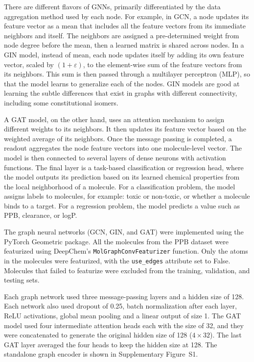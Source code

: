 \documentclass[11pt,a4paper]{article}
\begin{document}
There are different flavors of GNNs, primarily differentiated by the data aggregation method used by each node.
For example, in GCN, a node updates its feature vector as a mean that includes all the feature vectors from its immediate neighbors and itself.
The neighbors are assigned a pre-determined weight from node degree before the mean, then a learned matrix is shared across nodes.
In a GIN model, instead of mean, each node updates itself by adding its own feature vector, scaled by $(1+\varepsilon)$, to the element-wise sum of the feature vectors from its neighbors.
This sum is then passed through a multilayer perceptron (MLP), so that the model learns to generalize each of the nodes.
GIN models are good at learning the subtle differences that exist in graphs with different connectivity, including some constitutional isomers.

A GAT model, on the other hand, uses an attention mechanism to assign different weights to its neighbors.
It then updates its feature vector based on the weighted average of its neighbors.
Once the message passing is completed, a readout aggregates the node feature vectors into one molecule-level vector.
The model is then connected to several layers of dense neurons with activation functions.
The final layer is a task-based classification or regression head, where the model outputs its prediction based on its learned chemical properties from the local neighborhood of a molecule.
For a classification problem, the model assigns labels to molecules, for example: toxic or non-toxic, or whether a molecule binds to a target.
For a regression problem, the model predicts a value such as PPB, clearance, or logP.

The graph neural networks (GCN, GIN, and GAT) were implemented using the PyTorch Geometric package.
All the molecules from the PPB dataset were featurized using DeepChem's \texttt{MolGraphConvFeaturizer} function.
Only the atoms in the molecules were featurized, with the \texttt{use\_edges} attribute set to False.
Molecules that failed to featurize were excluded from the training, validation, and testing sets.

Each graph network used three message-passing layers and a hidden size of 128.
Each network also used dropout of 0.25, batch normalization after each layer, ReLU activations, global mean pooling and a linear output of size 1.
The GAT model used four intermediate attention heads each with the size of 32, and they were concatenated to generate the original hidden size of 128 ($4 \times 32$).
The last GAT layer averaged the four heads to keep the hidden size at 128.
The standalone graph encoder is shown in Supplementary Figure~S1.
\end{document}
